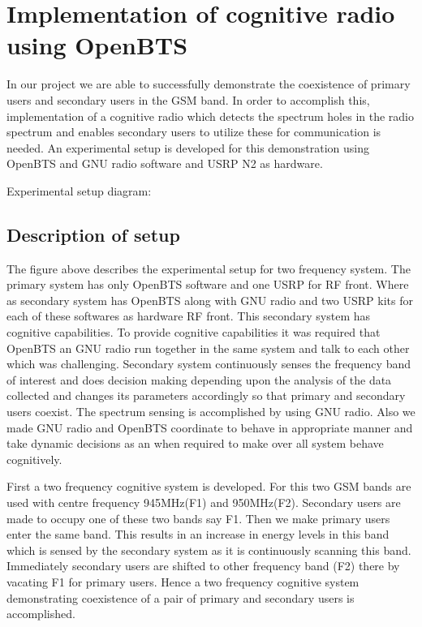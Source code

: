 \chapter{Implementation of cognitive radio using OpenBTS}

In our project we are able to successfully demonstrate the
coexistence of primary users and secondary users in the
GSM band. In order to accomplish this, implementation of
a cognitive radio which detects the spectrum holes in the
radio spectrum and enables secondary users to utilize these 
for communication is needed. An experimental setup is 
developed for this demonstration using OpenBTS and GNU 
radio software and USRP N2 as hardware.

Experimental setup diagram:


\section{Description of setup}
The figure above describes the experimental setup for 
two frequency system. The primary system has only
OpenBTS software and one USRP for RF front. Where as 
secondary system has OpenBTS along with GNU radio and 
two USRP kits for each of these softwares as hardware 
RF front. This secondary system has cognitive capabilities. 
To provide cognitive capabilities it was required that 
OpenBTS an GNU radio run together in the same system and 
talk to each other which was challenging. Secondary system
continuously senses the frequency band of interest and does 
decision making depending upon the analysis of the data 
collected and changes its parameters accordingly so that 
primary and secondary users coexist. The spectrum sensing 
is accomplished by using GNU radio. Also we made GNU radio 
and OpenBTS coordinate to behave in appropriate manner and 
take dynamic decisions as an when required to make over all
system behave cognitively.

First a two frequency cognitive system is developed.
For this two GSM bands are used with centre frequency
945MHz(F1) and 950MHz(F2). Secondary users are made to occupy
one of these two bands say F1. Then we make primary users 
enter the same band. This results in an increase in energy 
levels in this band which is sensed by the secondary system 
as it is continuously scanning this band. Immediately
secondary users are shifted to other frequency band (F2)
there by vacating F1 for primary users. Hence a two frequency
cognitive system demonstrating coexistence of a pair of
primary and secondary users is accomplished. 

